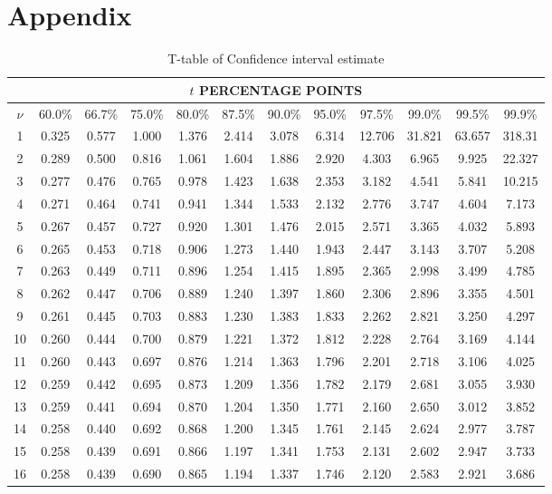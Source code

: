 \documentclass[12pt, a4paper]{article}
\begin{document}
\section*{Appendix}
\begin{table}[!htp]
\begin{center}

\caption{T-table of Confidence interval estimate}
\begin{tabular}{|c|c|c|c|c|c|c|c|c|c|c|c|}
\multicolumn{12}{c}{$t$ PERCENTAGE POINTS} \\
\hline
$\nu$&60.0\%&66.7\%&75.0\%&80.0\%&87.5\%&90.0\%&95.0\%&97.5\%&99.0\%&99.5\%
     &99.9\% \\
\hline
\hline
 1&0.325&0.577&1.000&1.376&2.414&3.078&6.314&12.706&31.821&63.657&318.31 \\
\hline
 2&0.289&0.500&0.816&1.061&1.604&1.886&2.920&4.303&6.965&9.925&22.327 \\
\hline
 3&0.277&0.476&0.765&0.978&1.423&1.638&2.353&3.182&4.541&5.841&10.215 \\
\hline
 4&0.271&0.464&0.741&0.941&1.344&1.533&2.132&2.776&3.747&4.604&7.173 \\
\hline
 5&0.267&0.457&0.727&0.920&1.301&1.476&2.015&2.571&3.365&4.032&5.893 \\
\hline
 6&0.265&0.453&0.718&0.906&1.273&1.440&1.943&2.447&3.143&3.707&5.208 \\
\hline
 7&0.263&0.449&0.711&0.896&1.254&1.415&1.895&2.365&2.998&3.499&4.785 \\
\hline
 8&0.262&0.447&0.706&0.889&1.240&1.397&1.860&2.306&2.896&3.355&4.501 \\
\hline
 9&0.261&0.445&0.703&0.883&1.230&1.383&1.833&2.262&2.821&3.250&4.297 \\
\hline
10&0.260&0.444&0.700&0.879&1.221&1.372&1.812&2.228&2.764&3.169&4.144 \\
\hline
11&0.260&0.443&0.697&0.876&1.214&1.363&1.796&2.201&2.718&3.106&4.025 \\
\hline
12&0.259&0.442&0.695&0.873&1.209&1.356&1.782&2.179&2.681&3.055&3.930 \\
\hline
13&0.259&0.441&0.694&0.870&1.204&1.350&1.771&2.160&2.650&3.012&3.852 \\
\hline
14&0.258&0.440&0.692&0.868&1.200&1.345&1.761&2.145&2.624&2.977&3.787 \\
\hline
15&0.258&0.439&0.691&0.866&1.197&1.341&1.753&2.131&2.602&2.947&3.733 \\
\hline
16&0.258&0.439&0.690&0.865&1.194&1.337&1.746&2.120&2.583&2.921&3.686 \\

\end{tabular}
\end{center}
\end{table}
\end{document}
